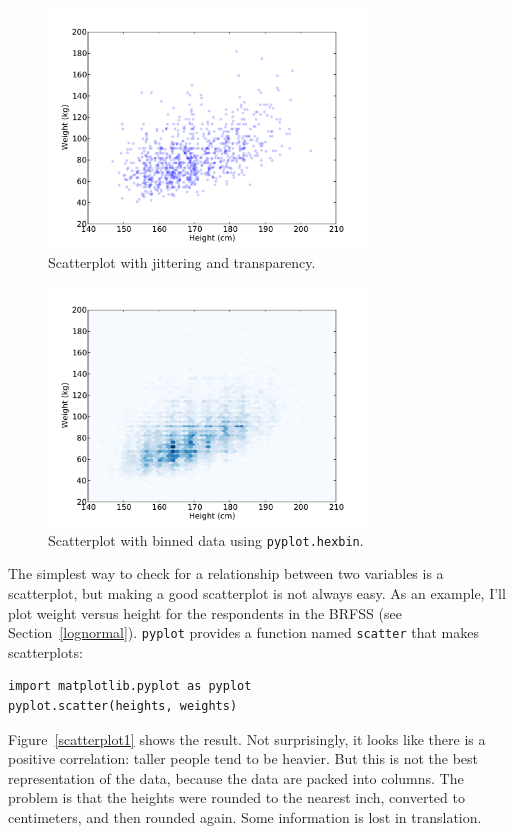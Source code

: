 \documentclass[12pt]{book}
\begin{document}
\begin{figure}
\centerline{\includegraphics[height=2.5in]{figs/scatter3.pdf}}
\caption{Scatterplot with jittering and transparency.}
\label{scatterplot3}
\end{figure}

\begin{figure}
\centerline{\includegraphics[height=2.5in]{figs/scatter4.pdf}}
\caption{Scatterplot with binned data using {\tt pyplot.hexbin}.}
\label{scatterplot4}
\end{figure}

The simplest way to check for a relationship between two variables
is a scatterplot, but making a good scatterplot is not always easy.
As an example, I'll plot weight versus height for the respondents
in the BRFSS (see Section~\ref{lognormal}).  {\tt pyplot} provides
a function named {\tt scatter} that makes scatterplots:
%
\begin{verbatim}
import matplotlib.pyplot as pyplot
pyplot.scatter(heights, weights)
\end{verbatim}

Figure~\ref{scatterplot1} shows the result.  Not surprisingly, it
looks like there is a positive correlation: taller people tend to be
heavier.  But this is not the best representation of the data, because
the data are packed into columns.  The problem is that the heights
were rounded to the nearest inch, converted to centimeters, and
then rounded again.  Some information is lost in translation.
\end{document}
